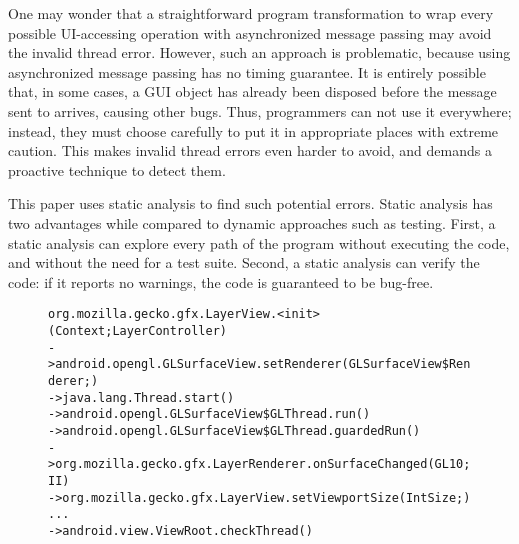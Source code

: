 One may wonder that a straightforward program transformation to wrap
every possible UI-accessing operation with asynchronized message passing
may avoid the invalid thread error. However, such an approach is problematic,
because using asynchronized message passing has no timing
guarantee. It is entirely possible that, in some cases, a GUI object has already been
disposed before the message sent to arrives, causing other bugs. Thus, programmers can not use
it everywhere; instead, they must choose carefully to put it in appropriate places
with extreme caution. This makes invalid thread errors even harder to avoid,
and demands a proactive technique to detect them.


This paper uses static analysis to find such potential errors.
Static analysis has two advantages while compared to dynamic approaches such as
 testing. First, a static analysis can explore every path of the program without
executing the code, and without the need for a test suite.
Second, a static analysis can verify the code: if it
reports no warnings, the code is guaranteed to be bug-free. 


\begin{figure}[t]
\begin{CodeOut}
\begin{alltt}

   org.mozilla.gecko.gfx.LayerView.<init>(Context;LayerController)
-> android.opengl.GLSurfaceView.setRenderer(GLSurfaceView\$Renderer;)
-> java.lang.Thread.start()
-> android.opengl.GLSurfaceView\$GLThread.run()
-> android.opengl.GLSurfaceView\$GLThread.guardedRun()
-> org.mozilla.gecko.gfx.LayerRenderer.onSurfaceChanged(GL10;II)
-> org.mozilla.gecko.gfx.LayerView.setViewportSize(IntSize;)
...
-> android.view.ViewRoot.checkThread()
\end{alltt}
\end{CodeOut}
\vspace*{-2.0ex}  %
\end{figure}

